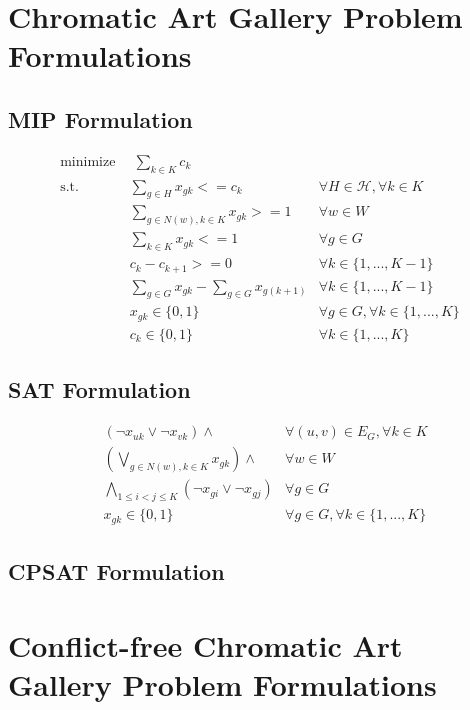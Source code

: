 \chapter{Chromatic Art Gallery Problem Formulations}

\section{MIP Formulation}

\begin{align}
\label{eq:f.0} \mbox{minimize}~& \;\sum_{k\in K} c_{k}& \\
\label{eq:f.1} \mbox{s.t. } &\sum_{g \in H}x_{gk} <= c_{k} & \forall H \in \mathcal{H}, \forall k\in K\\
\label{eq:f.2}&\sum_{g\in N(w), k\in K}x_{gk}>=1 & \forall w\in W\\
\label{eq:f.3}&\sum_{k\in K}x_{gk}<=1 & \forall g\in G\\
\label{eq:f.4}&c_{k} - c_{k+1} >= 0 & \forall k\in \{1,...,K-1\}\\
\label{eq:f.5}&\sum_{g\in G}x_{gk} - \sum_{g\in G}x_{g(k+1)} & \forall k\in \{1,...,K-1\}\\
\label{eq:f.6}& x_{gk} \in \{0,1\} & \forall g\in G, \forall k\in \{1,...,K\}\\
\label{eq:f.7}& c_{k}\in \{0,1\} & \forall k\in \{1,...,K\}
\end{align}

\section{SAT Formulation}

\begin{align}
\label{eq:f.0}&(\lnot x_{uk} \lor \lnot x_{vk}) \land & \forall (u,v)\in E_{G}, \forall k\in K\\
\label{eq:f.1}&(\bigvee_{g\in N(w), k\in K}x_{gk}) \land & \forall w\in W\\
\label{eq:f.2}&\bigwedge_{1 \leq i < j \leq K} (\lnot x_{gi} \lor \lnot x_{gj})
 & \forall g\in G\\
\label{eq:f.3}& x_{gk} \in \{0,1\} & \forall g\in G, \forall k\in \{1,...,K\}
\end{align}

\section{CPSAT Formulation}

\chapter{Conflict-free Chromatic Art Gallery Problem Formulations}

